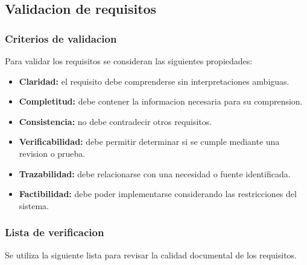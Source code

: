 \documentclass[12pt,a4paper]{article}
\begin{document}
\subsection{Validacion de requisitos}

\subsubsection{Criterios de validacion}

Para validar los requisitos se consideran
las siguientes propiedades:

\begin{itemize}

    \item \textbf{Claridad:} el requisito debe
    comprenderse sin interpretaciones ambiguas.

    \item \textbf{Completitud:} debe contener
    la informacion necesaria para su comprension.

    \item \textbf{Consistencia:} no debe contradecir
    otros requisitos.

    \item \textbf{Verificabilidad:} debe permitir
    determinar si se cumple mediante una revision
    o prueba.

    \item \textbf{Trazabilidad:} debe relacionarse
    con una necesidad o fuente identificada.

    \item \textbf{Factibilidad:} debe poder
    implementarse considerando las restricciones
    del sistema.

\end{itemize}

\subsubsection{Lista de verificacion}

Se utiliza la siguiente lista para revisar
la calidad documental de los requisitos.
\end{document}
